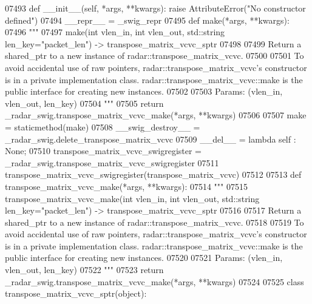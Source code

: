 \begin{DoxyCode}
{{{{{{{{{{{{{{{{{{{{{{{{{07493     \textcolor{keyword}{def }__init__(self, *args, **kwargs): \textcolor{keywordflow}{raise} AttributeError(\textcolor{stringliteral}{"No constructor defined"})
07494     \_\_repr\_\_ = \_swig\_repr
07495     \textcolor{keyword}{def }make(*args, **kwargs):
07496         \textcolor{stringliteral}{"""}
07497 \textcolor{stringliteral}{        make(int vlen\_in, int vlen\_out, std::string len\_key="packet\_len") -> transpose\_matrix\_vcvc\_sptr}
07498 \textcolor{stringliteral}{}
07499 \textcolor{stringliteral}{        Return a shared\_ptr to a new instance of radar::transpose\_matrix\_vcvc.}
07500 \textcolor{stringliteral}{}
07501 \textcolor{stringliteral}{        To avoid accidental use of raw pointers, radar::transpose\_matrix\_vcvc's constructor is in a private
       implementation class. radar::transpose\_matrix\_vcvc::make is the public interface for creating new
       instances.}
07502 \textcolor{stringliteral}{}
07503 \textcolor{stringliteral}{        Params: (vlen\_in, vlen\_out, len\_key)}
07504 \textcolor{stringliteral}{        """}
07505         \textcolor{keywordflow}{return} \_radar\_swig.transpose\_matrix\_vcvc\_make(*args, **kwargs)
07506 
07507     make = staticmethod(make)
07508     \_\_swig\_destroy\_\_ = \_radar\_swig.delete\_transpose\_matrix\_vcvc
07509     \_\_del\_\_ = \textcolor{keyword}{lambda} self : \textcolor{keywordtype}{None};
07510 transpose\_matrix\_vcvc\_swigregister = \_radar\_swig.transpose\_matrix\_vcvc\_swigregister
07511 transpose_matrix_vcvc_swigregister(transpose\_matrix\_vcvc)
07512 
07513 \textcolor{keyword}{def }transpose_matrix_vcvc_make(*args, **kwargs):
07514   \textcolor{stringliteral}{"""}
07515 \textcolor{stringliteral}{    transpose\_matrix\_vcvc\_make(int vlen\_in, int vlen\_out, std::string len\_key="packet\_len") ->
       transpose\_matrix\_vcvc\_sptr}
07516 \textcolor{stringliteral}{}
07517 \textcolor{stringliteral}{    Return a shared\_ptr to a new instance of radar::transpose\_matrix\_vcvc.}
07518 \textcolor{stringliteral}{}
07519 \textcolor{stringliteral}{    To avoid accidental use of raw pointers, radar::transpose\_matrix\_vcvc's constructor is in a private
       implementation class. radar::transpose\_matrix\_vcvc::make is the public interface for creating new instances.}
07520 \textcolor{stringliteral}{}
07521 \textcolor{stringliteral}{    Params: (vlen\_in, vlen\_out, len\_key)}
07522 \textcolor{stringliteral}{    """}
07523   \textcolor{keywordflow}{return} \_radar\_swig.transpose\_matrix\_vcvc\_make(*args, **kwargs)
07524 
07525 \textcolor{keyword}{class }transpose_matrix_vcvc_sptr(object):
}}}}}}}}}}}}}}}}}}}}}}}}}
\end{DoxyCode}
